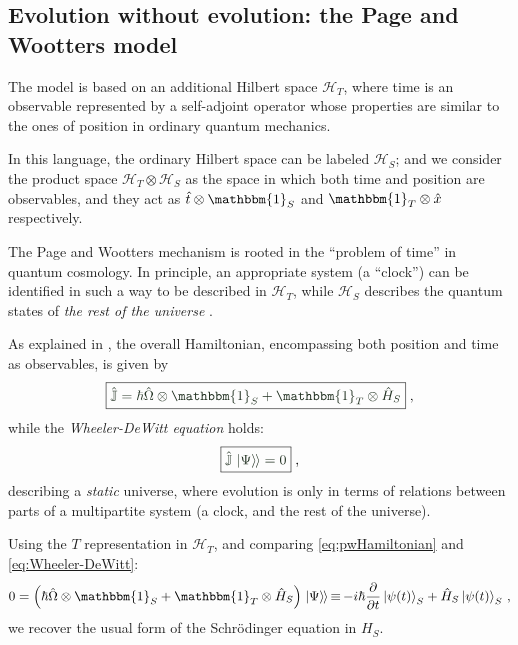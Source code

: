 \documentclass[a0,portrait]{a0poster}
\newcommand{\term}[1]{\emph{#1}}
\newcommand{\idop}{\mathbbm{1}}           %
\newcommand{\hilb}[1]{\mathcal{#1}}       %
\newcommand{\ox}{\otimes}
\DeclareMathOperator*{\repr}{\equiv}      %
\newcommand{\smallback}{\hspace{-0.115em}}
\newcommand{\dket}[1]{\left.\left| #1 \right\rangle\smallback\right\rangle}
\begin{document}
\begin{multicols}{2}

\color{DarkSlateGray} %

\section*{Evolution without evolution: the Page and Wootters model}

The model \cite{Lloyd:Time, Maccone:Pauli} is based on
an additional Hilbert space $\mathcal{H}_T$,
where time is an observable
represented by a self-adjoint operator
whose properties are similar to the ones of position
in ordinary quantum mechanics.

In this language, the ordinary Hilbert space can be labeled $\mathcal{H}_S$;
and we consider the product space $\mathcal{H}_T \otimes \mathcal{H}_S$ as
the space in which both time and position are observables, and they act as
$\hat{t} \otimes \idop_S$ and $\idop_T \otimes \hat{x}$
respectively.

The Page and Wootters mechanism is rooted in the ``problem of time''
in quantum cosmology.
In principle, an appropriate system (a ``clock'') can be identified in such a way
to be described in $\mathcal{H}_T$, while $\mathcal{H}_S$ describes
the quantum states of \emph{the rest of the universe} \cite{Marletto:Evolution}.

As explained in \cite{Lloyd:Time, Maccone:Pauli}, the overall Hamiltonian,
encompassing both position and time as observables, is given by
\begin{equation}\label{eq:pwHamiltonian}
    \boxed{\color{boxedcolor} \hat{\mathbb{J}} = \hbar\hat{\Omega}\ox\idop_S + \idop_T\ox\hat{H}_S}
    \;\text{,}
\end{equation}
while the \term{Wheeler-DeWitt equation} holds:
\begin{equation}\label{eq:Wheeler-DeWitt}
  \boxed{\color{boxedcolor} \hat{\mathbb{J}}\dket{\Psi} = 0}
  \;\text{,}
\end{equation}
describing a \emph{static} universe, where evolution is only
in terms of relations between parts of a multipartite system
(a clock, and the rest of the universe).

Using the $T$ representation in $\hilb{H}_T$,
and comparing \eqref{eq:pwHamiltonian} and \eqref{eq:Wheeler-DeWitt}:
\begin{equation}\label{eq:schrod_from_pw}
  0 = \qty(\hbar\hat{\Omega}\ox\idop_S + \idop_{T}\ox\hat{H}_S)\dket{\Psi}
    \repr -i\hbar\pdv{t}\ket{\psi(t)}_{S} + \hat{H}_S\ket{\psi(t)}_{S}
    \,\text{,}
\end{equation}
we recover the usual form of the Schr\"{o}dinger equation in $H_S$.


\end{multicols}
\end{document}
